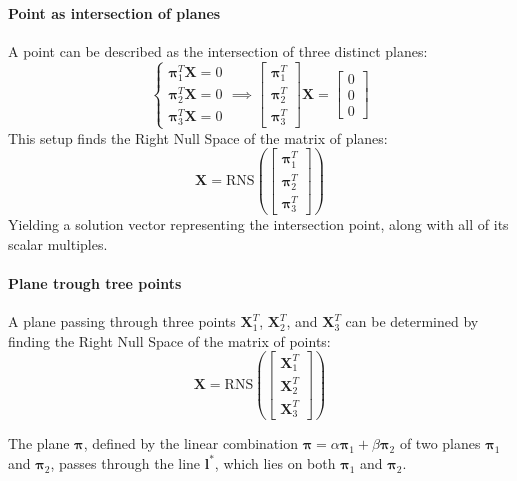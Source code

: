 \paragraph*{Point as intersection of planes}
A point can be described as the intersection of three distinct planes:
\[\begin{cases}
    \boldsymbol{\pi}_1^T\mathbf{X}=0 \\
    \boldsymbol{\pi}_2^T\mathbf{X}=0 \\
    \boldsymbol{\pi}_3^T\mathbf{X}=0 
\end{cases}\implies\begin{bmatrix} \boldsymbol{\pi}_1^T \\ \boldsymbol{\pi}_2^T \\ \boldsymbol{\pi}_3^T \end{bmatrix}\mathbf{X}=\begin{bmatrix} 0 \\ 0 \\ 0 \end{bmatrix}\]
This setup finds the Right Null Space of the matrix of planes:
\[\mathbf{X}=\text{RNS}\left(\begin{bmatrix} \boldsymbol{\pi}_1^T \\ \boldsymbol{\pi}_2^T \\ \boldsymbol{\pi}_3^T \end{bmatrix}\right)\]
Yielding a solution vector representing the intersection point, along with all of its scalar multiples.

\paragraph*{Plane trough tree points}
A plane passing through three points $\mathbf{X}_1^T$, $\mathbf{X}_2^T$, and $\mathbf{X}_3^T$ can be determined by finding the Right Null Space of the matrix of points:
\[\mathbf{X}=\text{RNS}\left(\begin{bmatrix} \mathbf{X}_1^T \\ \mathbf{X}_2^T \\ \mathbf{X}_3^T \end{bmatrix}\right)\]
\begin{property}
    The plane $\boldsymbol{\pi}$, defined by the linear combination $\boldsymbol{\pi} = \alpha \boldsymbol{\pi}_1 + \beta\boldsymbol{\pi}_2$ of two planes $\boldsymbol{\pi}_1$ and $\boldsymbol{\pi}_2$, passes through the line $\mathbf{l}^\ast$, which lies on both $\boldsymbol{\pi}_1$ and $\boldsymbol{\pi}_2$. 
\end{property}